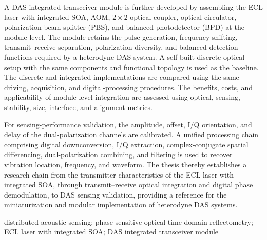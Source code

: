A DAS integrated transceiver module is further developed by assembling the ECL laser with integrated SOA, AOM, $2\times2$ optical coupler, optical circulator, polarization beam splitter (PBS), and balanced photodetector (BPD) at the module level. The module retains the pulse-generation, frequency-shifting, transmit--receive separation, polarization-diversity, and balanced-detection functions required by a heterodyne DAS system. A self-built discrete optical setup with the same components and functional topology is used as the baseline. The discrete and integrated implementations are compared using the same driving, acquisition, and digital-processing procedures. The benefits, costs, and applicability of module-level integration are assessed using optical, sensing, stability, size, interface, and alignment metrics.

For sensing-performance validation, the amplitude, offset, I/Q orientation, and delay of the dual-polarization channels are calibrated. A unified processing chain comprising digital downconversion, I/Q extraction, complex-conjugate spatial differencing, dual-polarization combining, and filtering is used to recover vibration location, frequency, and waveform. The thesis thereby establishes a research chain from the transmitter characteristics of the ECL laser with integrated SOA, through transmit--receive optical integration and digital phase demodulation, to DAS sensing validation, providing a reference for the miniaturization and modular implementation of heterodyne DAS systems.

\bigskip
{} distributed acoustic sensing; phase-sensitive optical time-domain reflectometry; ECL laser with integrated SOA; DAS integrated transceiver module
